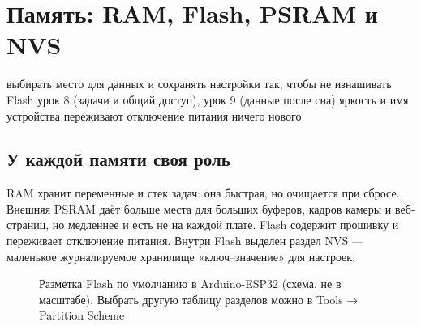 \section{Память: RAM, Flash, PSRAM и NVS}
\lessonintro
  {выбирать место для данных и сохранять настройки так, чтобы не изнашивать Flash}
  {урок 8 (задачи и общий доступ), урок 9 (данные после сна)}
  {яркость и имя устройства переживают отключение питания}
  {ничего нового}

\subsection{У каждой памяти своя роль}

RAM хранит переменные и стек задач: она быстрая, но очищается при сбросе. Внешняя PSRAM даёт больше
места для больших буферов, кадров камеры и веб-страниц, но медленнее и есть не на каждой плате.
Flash содержит прошивку и переживает отключение питания. Внутри Flash выделен раздел NVS --- маленькое
журналируемое хранилище «ключ--значение» для настроек.

\begin{figure}[H]
\centering
{}
\caption{Разметка Flash по умолчанию в Arduino-ESP32 (схема, не в масштабе). Выбрать другую таблицу
разделов можно в \textsf{Tools → Partition Scheme}}
\end{figure}


